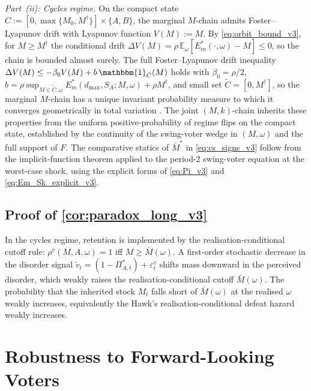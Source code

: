 \documentclass[11pt,twoside]{extarticle}
\begin{document}
\emph{Part~(ii): Cycles regime.} On the compact state $C:=[0,\max\{M_0,M^\dagger\}]\times\{A,B\}$, the marginal $M$-chain admits Foster--Lyapunov drift with Lyapunov function $V(M):=M$. By \autoref{eq:orbit_bound_v3}, for $M\ge M^\dagger$ the conditional drift $\Delta V(M)=\rho\,\mathbb E_\omega[E_m^*(\cdot,\omega)-M]\le 0$, so the chain is bounded almost surely. The full Foster--Lyapunov drift inequality $\Delta V(M)\le-\beta_0 V(M)+b\,\mathbbm{1}_{\tilde C}(M)$ holds with $\beta_0=\rho/2$, $b=\rho\sup_{M\in\tilde C,\omega}E_m^*(d_{\max},S_A;M,\omega)+\rho M^\dagger$, and small set $\tilde C=[0,M^\dagger]$, so the marginal $M$-chain has a unique invariant probability measure to which it converges geometrically in total variation \citep[Ch.~14--15]{meynMarkovChainsStochastic2012}. The joint $(M,k)$-chain inherits these properties from the uniform positive-probability of regime flips on the compact state, established by the continuity of the swing-voter wedge in $(M,\omega)$ and the full support of $F$. The comparative statics of $\bar M^*$ in \autoref{eq:cs_signs_v3} follow from the implicit-function theorem applied to the period-2 swing-voter equation at the worst-case shock, using the explicit forms of \autoref{eq:Pi_v3} and \autoref{eq:Em_Sk_explicit_v3}.

\subsection*{Proof of \autoref{cor:paradox_long_v3}} \label{oa:proof_paradox_long_v3}

In the cycles regime, retention is implemented by the realisation-conditional cutoff rule: $\rho^v(M,A,\omega)=1$ iff $M\ge\bar M(\omega)$. A first-order stochastic decrease in the disorder signal $\tilde v_t=(1-\Pi_{A,t}^*)+\varepsilon_t^v$ shifts mass downward in the perceived disorder, which weakly raises the realisation-conditional cutoff $\bar M(\omega)$. The probability that the inherited stock $M_t$ falls short of $\bar M(\omega)$ at the realised $\omega$ weakly increases, equivalently the Hawk's realisation-conditional defeat hazard weakly increases.


\section{Robustness to Forward-Looking Voters}\label{oa:robust_fwd}
\end{document}
